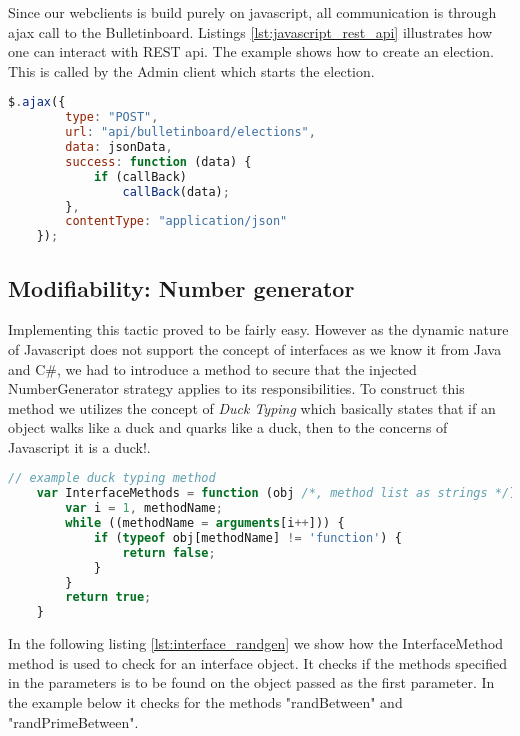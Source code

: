 \noindent
Since our webclients is build purely on javascript, all communication is through ajax call to the Bulletinboard. Listings \ref{lst:javascript_rest_api} illustrates how one can interact with REST api. The example shows how to create an election. This is called by the Admin client which starts the election.   \\ 


\begin{lstlisting}[language=Javascript, caption=Javascript example, label=lst:javascript_rest_api]
    $.ajax({
        type: "POST",
        url: "api/bulletinboard/elections",
        data: jsonData,
        success: function (data) {
            if (callBack)
                callBack(data);
        },
        contentType: "application/json"
    });
\end{lstlisting}


 
\subsection{Modifiability: Number generator}
Implementing this tactic proved to be fairly easy. However as the dynamic nature of Javascript does not support the concept
of interfaces as we know it from Java and C\#, we had to introduce a method to secure that the injected NumberGenerator strategy
applies to its responsibilities. To construct this method we utilizes the concept of \textit{Duck Typing} which basically states that
if an object walks like a duck and quarks like a duck, then to the concerns of Javascript it is a duck!. 

\begin{lstlisting}[language=Javascript, caption=Implementation of Duck typing, label=lst:ducktyping]
    // example duck typing method
    var InterfaceMethods = function (obj /*, method list as strings */) {
        var i = 1, methodName;
        while ((methodName = arguments[i++])) {
            if (typeof obj[methodName] != 'function') {
                return false;
            }
        }
        return true;
    }
\end{lstlisting}

\noindent
In the following listing \ref{lst:interface_randgen} we show how the InterfaceMethod method is used to check
for an interface object. It checks if the methods specified in the parameters is to be found on the object passed as the 
first parameter. In the example below it checks for the methods "randBetween" and "randPrimeBetween".

